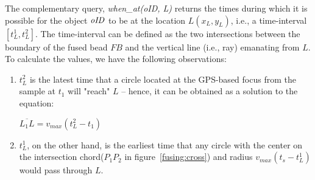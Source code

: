 
The complementary query, \textit{when\_at(oID, L)} returns the times during which it is possible for the object ${\it oID}$ to be at the location $L(x_L, y_L)$, i.e., a time-interval $[t_L^1, t_L^2]$. The time-interval can be defined as the two intersections between the boundary of the fused bead $FB$ and the vertical line (i.e., ray) emanating from $L$. To calculate the values, we have the following observations:

\begin{enumerate}

\item $t_L^2$ is the latest time that a circle located at the GPS-based focus from the sample at $t_1$ will "reach" $L$ -- hence, it can be obtained as a solution to the equation:

$\overline{L_1L} = v_{max} (t_L^2 - t_1)$

\item $t_L^1$, on the other hand, is the earliest time that any circle with the center on the intersection chord($P_{1}P_{2}$ in figure~\ref{fusing:cross}) and radius $v_{max} (t_s - t_L^1)$  would pass through $L$. 

\end{enumerate}

